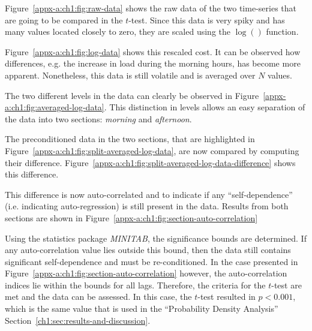 

Figure~\ref{appx-a:ch1:fig:raw-data} shows the raw data of the two time-series that are going to be compared in the $t$-test.
Since this data is very spiky and has many values located closely to zero, they are scaled using the $\log()$ function.



Figure~\ref{appx-a:ch1:fig:log-data} shows this rescaled cost.
It can be observed how differences, e.g. the increase in load during the morning hours, has become more apparent.
Nonetheless, this data is still volatile and is averaged over $N$ values.



The two different levels in the data can clearly be observed in Figure~\ref{appx-a:ch1:fig:averaged-log-data}.
This distinction in levels allows an easy separation of the data into two sections: \textit{morning} and \textit{afternoon}.



The preconditioned data in the two sections, that are highlighted in Figure~\ref{appx-a:ch1:fig:split-averaged-log-data}, are now compared by computing their difference.
Figure~\ref{appx-a:ch1:fig:split-averaged-log-data-difference} shows this difference.



This difference is now auto-correlated and to indicate if any ``self-dependence'' (i.e. indicating auto-regression) is still present in the data.
Results from both sections are shown in Figure~\ref{appx-a:ch1:fig:section-auto-correlation}



Using the statistics package \textit{MINITAB}, the significance bounds are determined.
If any auto-correlation value lies outside this bound, then the data still contains significant self-dependence and must be re-conditioned.
In the case presented in Figure~\ref{appx-a:ch1:fig:section-auto-correlation} however, the auto-correlation indices lie within the bounds for all lags.
Therefore, the criteria for the $t$-test are met and the data can be assessed.
In this case, the $t$-test resulted in $p<0.001$, which is the same value that is used in the ``Probability Density Analysis'' Section~\ref{ch1:sec:results-and-discussion}.





